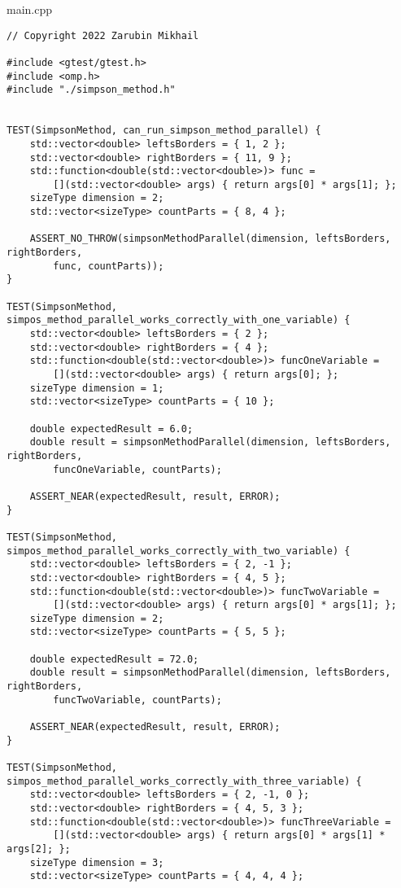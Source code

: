 \documentclass{report}
\begin{document}
main.cpp
\begin{lstlisting}
// Copyright 2022 Zarubin Mikhail

#include <gtest/gtest.h>
#include <omp.h>
#include "./simpson_method.h"


TEST(SimpsonMethod, can_run_simpson_method_parallel) {
    std::vector<double> leftsBorders = { 1, 2 };
    std::vector<double> rightBorders = { 11, 9 };
    std::function<double(std::vector<double>)> func =
        [](std::vector<double> args) { return args[0] * args[1]; };
    sizeType dimension = 2;
    std::vector<sizeType> countParts = { 8, 4 };

    ASSERT_NO_THROW(simpsonMethodParallel(dimension, leftsBorders, rightBorders,
        func, countParts));
}

TEST(SimpsonMethod, simpos_method_parallel_works_correctly_with_one_variable) {
    std::vector<double> leftsBorders = { 2 };
    std::vector<double> rightBorders = { 4 };
    std::function<double(std::vector<double>)> funcOneVariable =
        [](std::vector<double> args) { return args[0]; };
    sizeType dimension = 1;
    std::vector<sizeType> countParts = { 10 };

    double expectedResult = 6.0;
    double result = simpsonMethodParallel(dimension, leftsBorders, rightBorders,
        funcOneVariable, countParts);

    ASSERT_NEAR(expectedResult, result, ERROR);
}

TEST(SimpsonMethod, simpos_method_parallel_works_correctly_with_two_variable) {
    std::vector<double> leftsBorders = { 2, -1 };
    std::vector<double> rightBorders = { 4, 5 };
    std::function<double(std::vector<double>)> funcTwoVariable =
        [](std::vector<double> args) { return args[0] * args[1]; };
    sizeType dimension = 2;
    std::vector<sizeType> countParts = { 5, 5 };

    double expectedResult = 72.0;
    double result = simpsonMethodParallel(dimension, leftsBorders, rightBorders,
        funcTwoVariable, countParts);

    ASSERT_NEAR(expectedResult, result, ERROR);
}

TEST(SimpsonMethod, simpos_method_parallel_works_correctly_with_three_variable) {
    std::vector<double> leftsBorders = { 2, -1, 0 };
    std::vector<double> rightBorders = { 4, 5, 3 };
    std::function<double(std::vector<double>)> funcThreeVariable =
        [](std::vector<double> args) { return args[0] * args[1] * args[2]; };
    sizeType dimension = 3;
    std::vector<sizeType> countParts = { 4, 4, 4 };


\end{lstlisting}
\end{document}
